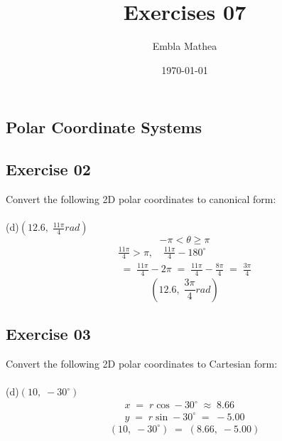 \documentclass[12pt, a4paper]{article}
\title{Exercises 07}
\author{Embla Mathea}
\date{\today}
\begin{document}
\maketitle

\begin{center}
	\section*{Polar Coordinate Systems}	
\end{center}

\subsection*{Exercise 02}
Convert the following 2D polar coordinates to
canonical form:\\\\		
	(d)\quad $\left(12.6,\;\frac{11\pi}{4}rad\right)$
		\begin{equation}
			\tag*{}
			-\pi<\theta\geq\pi
		\end{equation}
		\begin{gather}
			\tag*{}
				\frac{11\pi}{4}>\pi,\quad
				\frac{11\pi}{4}-180^\circ\\
			\tag*{}
				\;=\;\frac{11\pi}{4}-2\pi\;=\;
				\frac{11\pi}{4}-\frac{8\pi}{4}\;=\;
				\frac{3\pi}{4}
		\end{gather}
		\begin{equation}
			\tag{Canonical form}
				\left(12.6,\;\frac{3\pi}{4}rad\right)
		\end{equation}
\subsection*{Exercise 03}
Convert the following 2D polar coordinates
to Cartesian form:\\\\
	(d)\quad $(10,\;-30^\circ)$
		\begin{gather}
			\tag*{}
			x\;=\;r\cos-30^\circ \;\approx\; 8.66\\
			\tag*{}
			y\;=\;r\sin-30^\circ \;=\; -5.00
		\end{gather}
		\begin{equation}
			\tag{Cartesian form}
				(10,\;-30^\circ)\;=\;(8.66,\;-5.00)
		\end{equation}
		
\end{document}
